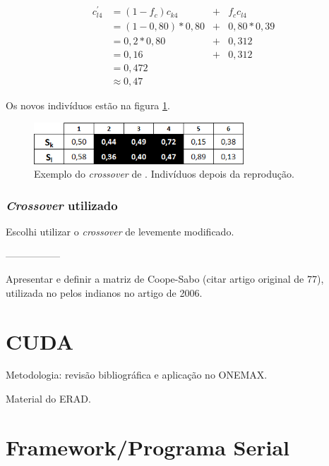 	
	\begin{equation}
		\begin{array}{llcl}
			c^{'}_{l4}	& = (1 - f_c) c_{k4} 		& + & f_c c_{l4} \\
									& = (1 - 0,80) * 0,80		& + &	0,80 * 0,39 \\
									& = 0,2 * 0,80					& + & 0,312	\\
									& = 0,16								& + & 0,312	\\
									& = 0,472 \\
									& \approx 0,47
		\end{array}
	\end{equation}
	
	Os novos indivíduos estão na figura \ref{fig:cross2011_tabelaDepois}.
		
	\begin{figure}[htbp]
	\centering
		\includegraphics[width=0.70\textwidth]{figs/materiais_metodo/autovalores_com_ga/cross2011_tabelaDepois.png}
	\caption{Exemplo do \emph{crossover} de \cite{metodo2011}. Indivíduos depois da reprodução.}
	\label{fig:cross2011_tabelaDepois}
\end{figure}
	
	
\subsubsection{\emph{Crossover} utilizado}	

	Escolhi utilizar o \emph{crossover} de \cite{metodo2011} levemente modificado.

-----------------

	Apresentar e definir a matriz de Coope-Sabo (citar artigo original de 77), utilizada no pelos indianos no artigo de 2006.


\section{CUDA}

Metodologia: revisão bibliográfica e aplicação no ONEMAX.

Material do ERAD.

\section{Framework/Programa Serial}


